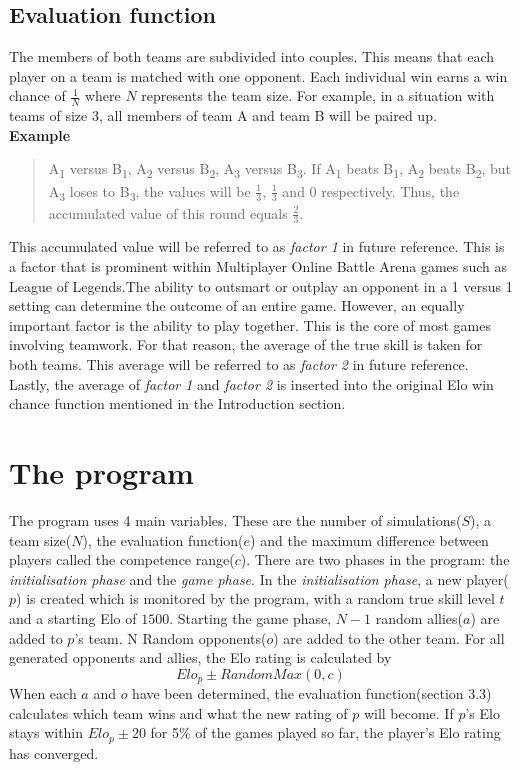 \documentclass[12pt]{article}
\begin{document}
\subsection{Evaluation function}
The members of both teams are subdivided into couples. This means that each player on a team is matched with one opponent. Each individual win earns a win chance of $\frac{1}{N}$ where $N$ represents the team size. 
For example, in a situation with teams of size 3, all members of team A and team B will be paired up.\\
\textbf{Example}
\begin{quote}
A\textsubscript{1} versus B\textsubscript{1}, A\textsubscript{2} versus B\textsubscript{2}, A\textsubscript{3} versus B\textsubscript{3}.
If A\textsubscript{1} beats B\textsubscript{1}, A\textsubscript{2} beats B\textsubscript{2}, but A\textsubscript{3} loses to B\textsubscript{3}, the values will be $\frac{1}{3}$, $\frac{1}{3}$ and $0$ respectively. Thus, the accumulated value of this round equals $\frac{2}{3}$.
\end{quote}

This accumulated value will be referred to as \textit{factor 1} in future reference. This is a factor that is prominent within Multiplayer Online Battle Arena games such as League of Legends\cite{moba}.The ability to outsmart or outplay an opponent in a 1 versus 1 setting can determine the outcome of an entire game. However, an equally important factor is the ability to play together. This is the core of most games involving teamwork. For that reason, the average of the true skill is taken for both teams. This average will be referred to as \textit{factor 2} in future reference.
Lastly, the average of \textit{factor 1} and \textit{factor 2} is inserted into the original Elo win chance function mentioned in the Introduction section.

\section{The program}
The program uses 4 main variables. These are the number of simulations($S$), a team size($N$), the evaluation function($e$)  and the maximum difference between players called the competence range($c$). There are two phases in the program: the \textit{initialisation phase} and the \textit{game phase}. In the \textit{initialisation phase}, a new player($p$) is created which is monitored by the program, with a random true skill level $t$  and a starting Elo of $1500$. Starting the game phase, $N - 1$ random allies($a$) are added to $p$’s team. N Random opponents($o$) are added to the other team. For all generated opponents and allies, the Elo rating is calculated by
\[Elo_p \pm RandomMax(0,c)\]
When each $a$ and $o$ have been determined, the evaluation function(section 3.3) calculates which team wins and what the new rating of $p$ will become. If $p$'s Elo stays within $Elo_p \pm 20$ for 5\% of the games played so far, the player's Elo rating has converged.
\end{document}
